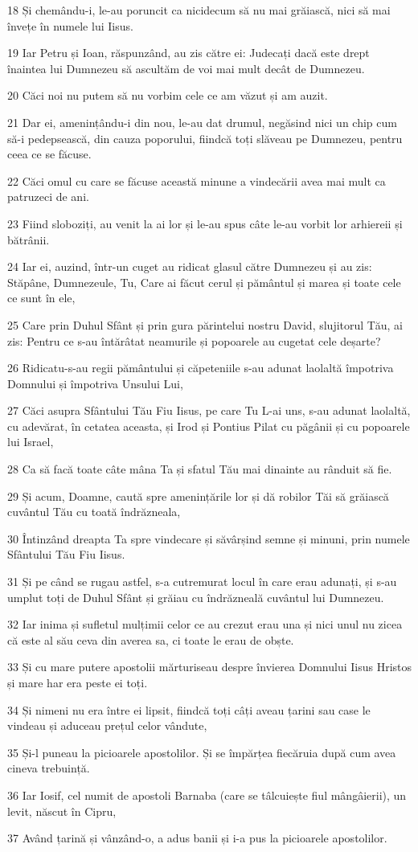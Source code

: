 \par 18 Și chemându-i, le-au poruncit ca nicidecum să nu mai grăiască, nici să mai învețe în numele lui Iisus.
\par 19 Iar Petru și Ioan, răspunzând, au zis către ei: Judecați dacă este drept înaintea lui Dumnezeu să ascultăm de voi mai mult decât de Dumnezeu.
\par 20 Căci noi nu putem să nu vorbim cele ce am văzut și am auzit.
\par 21 Dar ei, amenințându-i din nou, le-au dat drumul, negăsind nici un chip cum să-i pedepsească, din cauza poporului, fiindcă toți slăveau pe Dumnezeu, pentru ceea ce se făcuse.
\par 22 Căci omul cu care se făcuse această minune a vindecării avea mai mult ca patruzeci de ani.
\par 23 Fiind sloboziți, au venit la ai lor și le-au spus câte le-au vorbit lor arhiereii și bătrânii.
\par 24 Iar ei, auzind, într-un cuget au ridicat glasul către Dumnezeu și au zis: Stăpâne, Dumnezeule, Tu, Care ai făcut cerul și pământul și marea și toate cele ce sunt în ele,
\par 25 Care prin Duhul Sfânt și prin gura părintelui nostru David, slujitorul Tău, ai zis: Pentru ce s-au întărâtat neamurile și popoarele au cugetat cele deșarte?
\par 26 Ridicatu-s-au regii pământului și căpeteniile s-au adunat laolaltă împotriva Domnului și împotriva Unsului Lui,
\par 27 Căci asupra Sfântului Tău Fiu Iisus, pe care Tu L-ai uns, s-au adunat laolaltă, cu adevărat, în cetatea aceasta, și Irod și Pontius Pilat cu păgânii și cu popoarele lui Israel,
\par 28 Ca să facă toate câte mâna Ta și sfatul Tău mai dinainte au rânduit să fie.
\par 29 Și acum, Doamne, caută spre amenințările lor și dă robilor Tăi să grăiască cuvântul Tău cu toată îndrăzneala,
\par 30 Întinzând dreapta Ta spre vindecare și săvârșind semne și minuni, prin numele Sfântului Tău Fiu Iisus.
\par 31 Și pe când se rugau astfel, s-a cutremurat locul în care erau adunați, și s-au umplut toți de Duhul Sfânt și grăiau cu îndrăzneală cuvântul lui Dumnezeu.
\par 32 Iar inima și sufletul mulțimii celor ce au crezut erau una și nici unul nu zicea că este al său ceva din averea sa, ci toate le erau de obște.
\par 33 Și cu mare putere apostolii mărturiseau despre învierea Domnului Iisus Hristos și mare har era peste ei toți.
\par 34 Și nimeni nu era între ei lipsit, fiindcă toți câți aveau țarini sau case le vindeau și aduceau prețul celor vândute,
\par 35 Și-l puneau la picioarele apostolilor. Și se împărțea fiecăruia după cum avea cineva trebuință.
\par 36 Iar Iosif, cel numit de apostoli Barnaba (care se tâlcuiește fiul mângâierii), un levit, născut în Cipru,
\par 37 Având țarină și vânzând-o, a adus banii și i-a pus la picioarele apostolilor.

